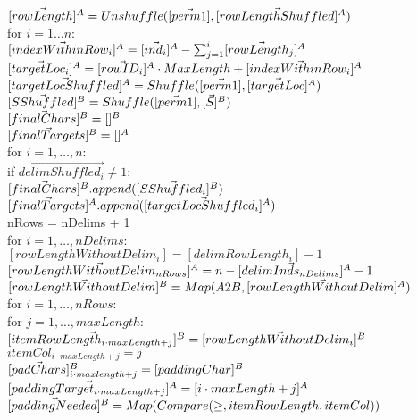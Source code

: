 \begin{protocol}
	\noindent
	$[\vec{rowLength}]^A = Unshuffle([\vec{perm1}], [\vec{rowLengthShuffled}]^A)$ \\
	for $i = 1 \ldots n:$\\
	\indent $[\vec{indexWithinRow_i}]^A = [\vec{ind_i}]^A - \sum_{j=1}^i [\vec{rowLength_j}]^A$\\
	\indent $[\vec{targetLoc_i}]^A = [\vec{rowID_i}]^A \cdot MaxLength +[\vec{indexWithinRow_i}]^A$\\
	
	\noindent
	$[\vec{targetLocShuffled}]^A = Shuffle([\vec{perm1}], [\vec{targetLoc}]^A)$ \\
	$[\vec{SShuffled}]^B = Shuffle([\vec{perm1}], [\vec{S}]^B)$ \\

	\noindent
	$[\vec{finalChars}]^B = []^B$\\
	$[\vec{finalTargets}]^B = []^A$ \\
	for $i = 1, \ldots, n$: \\
	\indent if $\vec{delimShuffled_i} \neq 1:$ \\
	\indent \indent $[\vec{finalChars}]^B.append([\vec{SShuffled_i}]^B) $\\
	\indent \indent	$[\vec{finalTargets}]^A.append([\vec{targetLocShuffled_i}]^A)$ \\
	
	\noindent
	nRows = nDelims + 1 \\
	for $i = 1, \ldots, nDelims$: \\
	\indent $[rowLengthWithoutDelim_i] = [delimRowLength_i] -1 $\\
	$[\vec{rowLengthWithoutDelim_{nRows}}]^A = n - [\vec{delimInds_{nDelims}}]^A - 1$\\
	$[\vec{rowLengthWithoutDelim}]^B = Map(A2B, [\vec{rowLengthWithoutDelim}]^A)$ \\

	\noindent
	for $i = 1, \ldots, nRows$:\\
	\indent for $j = 1, \ldots, maxLength$:\\
	\indent \indent $[\vec{itemRowLength_{i \cdot maxLength + j}}]^B = 
		[\vec{rowLengthWithoutDelim_i}]^B$ \\
	\indent \indent $itemCol_{i \cdot maxLength + j} = j$ \\
	\indent \indent $[\vec{padChars}]^B_{i \cdot maxlength + j} = [paddingChar]^B$ \\
	\indent \indent $[\vec{paddingTarget_{i \cdot maxLength + j}}]^A =[i \cdot maxLength + j]^A$\\
	$[\vec{paddingNeeded}]^B = Map(Compare(\geq, itemRowLength, itemCol)) $\\
	

\end{protocol}
